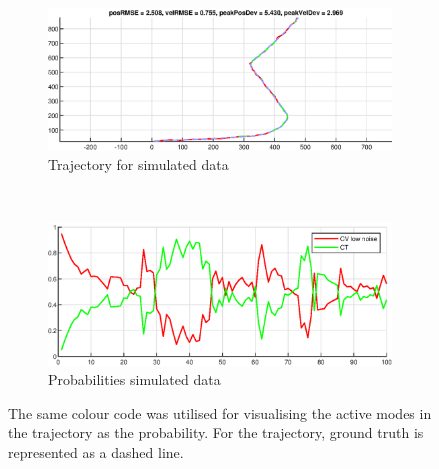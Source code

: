 \begin{figure}[ht]
    \begin{subfigure}[h]{0.4\textwidth}
        \includegraphics[width=\textwidth]{figures/ga_1/2_estimated_trajectory}
        \caption{Trajectory for simulated data}
        \label{fig:ga_1_2_estimated_trajectory}
    \end{subfigure}%
    ~
    \begin{subfigure}[h]{0.4\textwidth}
        \includegraphics[width=\textwidth]{figures/ga_1/2_probs}
        \caption{Probabilities simulated data}
        \label{fig:ga_1_2_probabilities}
    \end{subfigure}
    \caption{The same colour code was utilised for visualising the active modes in the trajectory as the probability. For the trajectory, ground truth is represented as a dashed line. }
    \label{fig:ga_1_2_traj_and_probs} 
\end{figure}

